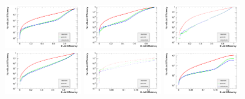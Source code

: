 \begin{figure}[hbtp]
   \centering
     \includegraphics[width=0.3\textwidth]{Chapters/04_Analysis/04a_BTags/Images/TrackCountingHighEfficiency_nonBJetEfficiency_v_bJetEfficiency}\hfill
     \includegraphics[width=0.3\textwidth]{Chapters/04_Analysis/04a_BTags/Images/TrackCountingHighPurity_nonBJetEfficiency_v_bJetEfficiency}\hfill
     \includegraphics[width=0.3\textwidth]{Chapters/04_Analysis/04a_BTags/Images/JetProbability_nonBJetEfficiency_v_bJetEfficiency}\\
     \includegraphics[width=0.3\textwidth]{Chapters/04_Analysis/04a_BTags/Images/JetBProbability_nonBJetEfficiency_v_bJetEfficiency}\hfill
     \includegraphics[width=0.3\textwidth]{Chapters/04_Analysis/04a_BTags/Images/SoftMuon_nonBJetEfficiency_v_bJetEfficiency}\hfill
     \includegraphics[width=0.3\textwidth]{Chapters/04_Analysis/04a_BTags/Images/SoftMuonByIP3d_nonBJetEfficiency_v_bJetEfficiency}\\

\end{figure}
